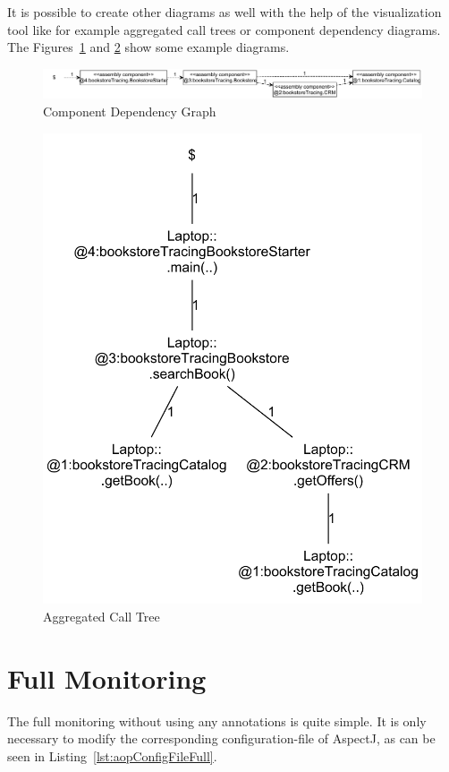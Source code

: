 It is possible to create other diagrams as well with the help of the visualization tool like for example aggregated call trees or component dependency diagrams. The Figures~\ref{fig:aspectJ:componentDependencyGraph} and \ref{fig:aspectJ:aggregatedCallTree} show some example diagrams.

\begin{figure}[H]
\centering
\includegraphics[width=1.0\textwidth]{images/ComponentDependencyGraph}
\caption{Component Dependency Graph}
\label{fig:aspectJ:componentDependencyGraph}
\end{figure}

\begin{figure}[H]
\centering
\includegraphics[scale=0.4]{images/AggregatedCallTree}
\caption{Aggregated Call Tree}
\label{fig:aspectJ:aggregatedCallTree}
\end{figure}

\section{Full Monitoring}\label{sec:aspectJ:fullweaving}
The full monitoring without using any annotations is quite simple. It is only necessary to modify the corresponding configuration-file of AspectJ, as can be seen in Listing~\ref{lst:aopConfigFileFull}.

